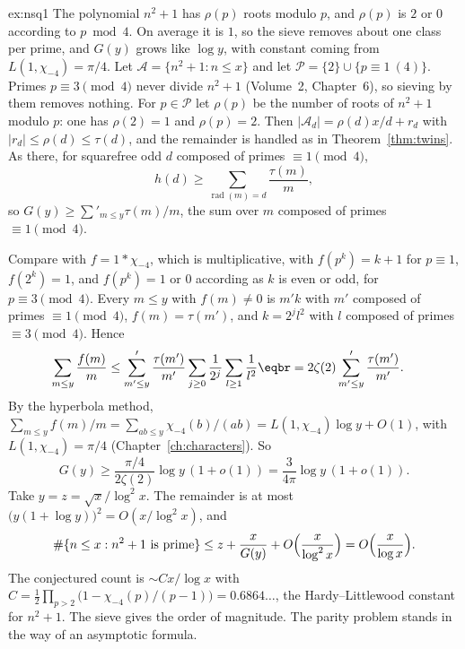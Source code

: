 \begin{solution}{ex:nsq1}
\idea The polynomial $n^2+1$ has $\rho(p)$ roots modulo $p$, and $\rho(p)$ is $2$ or $0$ according to $p\bmod4$. On average it is $1$, so the sieve removes about one class per prime, and $G(y)$ grows like $\log y$, with constant coming from $L(1,\chi_{-4})=\pi/4$.
\writeup Let $\mathcal A=\{n^2+1:n\le x\}$ and let $\mathcal P=\{2\}\cup\{p\equiv1\ (4)\}$. Primes $p\equiv3\pmod4$ never divide $n^2+1$ (Volume~2, Chapter~6), so sieving by them removes nothing. For $p\in\mathcal P$ let $\rho(p)$ be the number of roots of $n^2+1$ modulo $p$: one has $\rho(2)=1$ and $\rho(p)=2$. Then $|\mathcal A_d|=\rho(d)x/d+r_d$ with $|r_d|\le\rho(d)\le\tau(d)$, and the remainder is handled as in Theorem~\ref{thm:twins}. As there, for squarefree odd $d$ composed of primes $\equiv1\pmod4$,
\[
h(d)\ge\sum_{\operatorname{rad}(m)=d}\frac{\tau(m)}m,
\]
so $G(y)\ge\sum'_{m\le y}\tau(m)/m$, the sum over $m$ composed of primes $\equiv1\pmod4$.

Compare with $f=1*\chi_{-4}$, which is multiplicative, with $f(p^k)=k+1$ for $p\equiv1$, $f(2^k)=1$, and $f(p^k)=1$ or $0$ according as $k$ is even or odd, for $p\equiv3\pmod4$. Every $m\le y$ with $f(m)\ne0$ is $m'k$ with $m'$ composed of primes $\equiv1\pmod4$, $f(m)=\tau(m')$, and $k=2^jl^2$ with $l$ composed of primes $\equiv3\pmod4$. Hence
\[
\begin{aligned}\sum_{m\le y}\frac{f(m)}m&\le\sum'_{m'\le y}\frac{\tau(m')}{m'}\sum_{j\ge0}\frac1{2^j}\sum_{l\ge1}\frac1{l^2}\eqbr=2\zeta(2)\sum'_{m'\le y}\frac{\tau(m')}{m'}.\end{aligned}
\]
By the hyperbola method, $\sum_{m\le y}f(m)/m=\sum_{ab\le y}\chi_{-4}(b)/(ab)=L(1,\chi_{-4})\log y+O(1)$, with $L(1,\chi_{-4})=\pi/4$ (Chapter~\ref{ch:characters}). So
\[
G(y)\ge\frac{\pi/4}{2\zeta(2)}\log y\,(1+o(1))=\frac3{4\pi}\log y\,(1+o(1)).
\]
Take $y=z=\sqrt x/\log^2x$. The remainder is at most $\bigl(y(1+\log y)\bigr)^2=O(x/\log^2x)$, and
\[
\#\{n\le x:n^2+1\text{ is prime}\}\le z+\frac x{G(y)}+O\Bigl(\frac x{\log^2x}\Bigr)=O\Bigl(\frac x{\log x}\Bigr).
\]
The conjectured count is $\sim Cx/\log x$ with $C=\frac12\prod_{p>2}\bigl(1-\chi_{-4}(p)/(p-1)\bigr)=0.6864\ldots$, the Hardy--Littlewood constant for $n^2+1$. The sieve gives the order of magnitude. The parity problem stands in the way of an asymptotic formula.
\end{solution}


